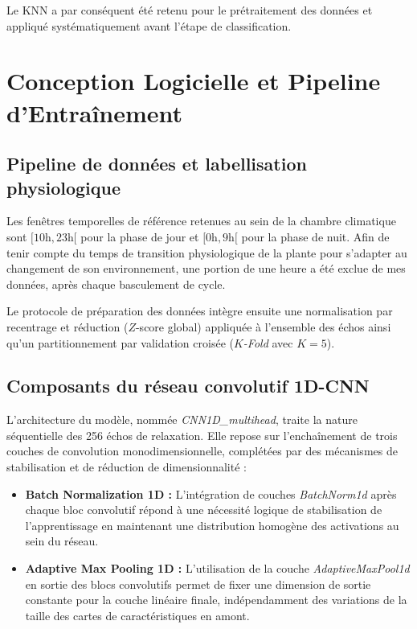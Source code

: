 \documentclass[12pt,a4paper,twoside]{article}
\begin{document}
Le KNN a par conséquent été retenu pour le prétraitement des données et appliqué systématiquement avant l'étape de classification.


\section{Conception Logicielle et Pipeline d'Entraînement}
\label{sec:architecture_pipeline}

\subsection{Pipeline de données et labellisation physiologique}
\label{subsec:pipeline_data}

Les fenêtres temporelles de référence retenues au sein de la chambre climatique sont $[10\text{h}, 23\text{h}[$ pour la phase de jour et $[0\text{h}, 9\text{h}[$ pour la phase de nuit. Afin de tenir compte du temps de transition physiologique de la plante pour s'adapter au changement de son environnement, une portion de une heure a été exclue de mes données, après chaque basculement de cycle.

Le protocole de préparation des données intègre ensuite une normalisation par recentrage et réduction ($Z$-score global) appliquée à l'ensemble des échos ainsi qu'un partitionnement par validation croisée (\textit{$K$-Fold} avec $K=5$).

\subsection{Composants du réseau convolutif 1D-CNN}
\label{subsec:architecture_cnn}

L'architecture du modèle, nommée \textit{CNN1D\_multihead}, traite la nature séquentielle des \num{256} échos de relaxation. Elle repose sur l'enchaînement de trois couches de convolution monodimensionnelle, complétées par des mécanismes de stabilisation et de réduction de dimensionnalité :
\begin{itemize}
    \item \textbf{Batch Normalization 1D :} L'intégration de couches \textit{BatchNorm1d} après chaque bloc convolutif répond à une nécessité logique de stabilisation de l'apprentissage en maintenant une distribution homogène des activations au sein du réseau.
    \item \textbf{Adaptive Max Pooling 1D :} L'utilisation de la couche \textit{AdaptiveMaxPool1d} en sortie des blocs convolutifs permet de fixer une dimension de sortie constante pour la couche linéaire finale, indépendamment des variations de la taille des cartes de caractéristiques en amont.
\end{itemize}
\end{document}
